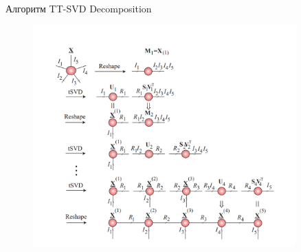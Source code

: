 \begin{frame}{Алгоритм TT-SVD Decomposition}
\begin{figure}
    \centering
    \includegraphics[width=0.9\textwidth]{lecture_15/figs/TT_algo.png}
\end{figure}
\end{frame}

